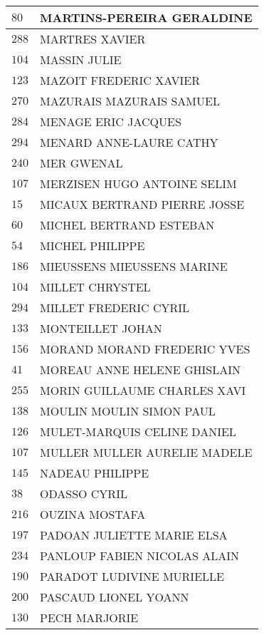 \begin{xltabular}{\linewidth}{|l|X|}
    \hline
    $80$ & MARTINS-PEREIRA GERALDINE \\
    \hline
    $288$ & MARTRES XAVIER \\
    \hline
    $104$ & MASSIN JULIE \\
    \hline
    $123$ & MAZOIT FREDERIC XAVIER \\
    \hline
    $270$ & MAZURAIS MAZURAIS SAMUEL \\
    \hline
    $284$ & MENAGE ERIC JACQUES \\
    \hline
    $294$ & MENARD ANNE-LAURE CATHY \\
    \hline
    $240$ & MER GWENAL \\
    \hline
    $107$ & MERZISEN HUGO ANTOINE SELIM \\
    \hline
    $15$ & MICAUX BERTRAND PIERRE JOSSE \\
    \hline
    $60$ & MICHEL BERTRAND ESTEBAN \\
    \hline
    $54$ & MICHEL PHILIPPE \\
    \hline
    $186$ & MIEUSSENS MIEUSSENS MARINE \\
    \hline
    $104$ & MILLET CHRYSTEL \\
    \hline
    $294$ & MILLET FREDERIC CYRIL \\
    \hline
    $133$ & MONTEILLET JOHAN \\
    \hline
    $156$ & MORAND MORAND FREDERIC YVES \\
    \hline
    $41$ & MOREAU ANNE HELENE GHISLAIN \\
    \hline
    $255$ & MORIN GUILLAUME CHARLES XAVI \\
    \hline
    $138$ & MOULIN MOULIN SIMON PAUL \\
    \hline
    $126$ & MULET-MARQUIS CELINE DANIEL \\
    \hline
    $107$ & MULLER MULLER AURELIE MADELE \\
    \hline
    $145$ & NADEAU PHILIPPE \\
    \hline
    $38$ & ODASSO CYRIL \\
    \hline
    $216$ & OUZINA MOSTAFA \\
    \hline
    $197$ & PADOAN JULIETTE MARIE ELSA \\
    \hline
    $234$ & PANLOUP FABIEN NICOLAS ALAIN \\
    \hline
    $190$ & PARADOT LUDIVINE MURIELLE \\
    \hline
    $200$ & PASCAUD LIONEL YOANN \\
    \hline
    $130$ & PECH MARJORIE \\

\end{xltabular}
